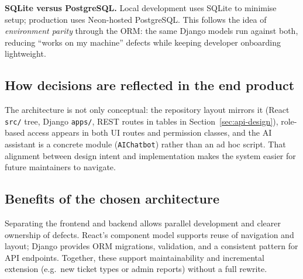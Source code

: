 \textbf{SQLite versus PostgreSQL.} Local development uses SQLite to minimise setup; production uses Neon-hosted PostgreSQL. This follows the idea of \emph{environment parity} through the ORM: the same Django models run against both, reducing ``works on my machine'' defects while keeping developer onboarding lightweight.

\subsection{How decisions are reflected in the end product}
The architecture is not only conceptual: the repository layout mirrors it (React \texttt{src/} tree, Django \texttt{apps/}, REST routes in tables in Section~\ref{sec:api-design}), role-based access appears in both UI routes and permission classes, and the AI assistant is a concrete module (\texttt{AIChatbot}) rather than an ad hoc script. That alignment between design intent and implementation makes the system easier for future maintainers to navigate.

\subsection{Benefits of the chosen architecture}
Separating the frontend and backend allows parallel development and clearer ownership of defects. React’s component model supports reuse of navigation and layout; Django provides ORM migrations, validation, and a consistent pattern for API endpoints. Together, these support maintainability and incremental extension (e.g.\ new ticket types or admin reports) without a full rewrite.
